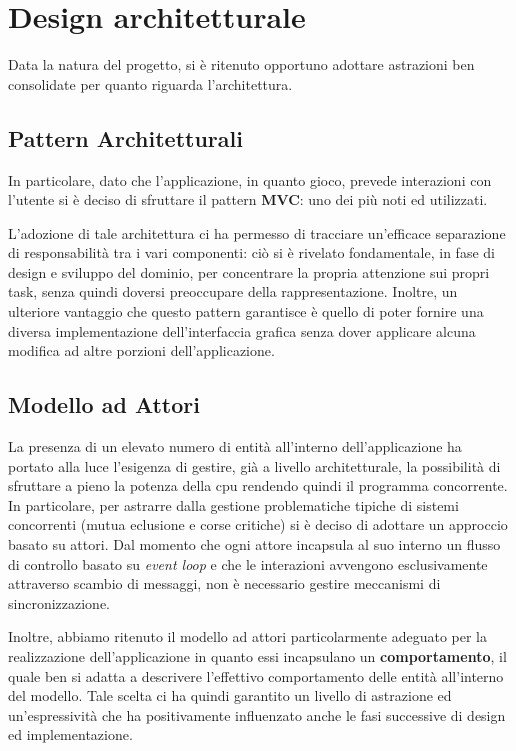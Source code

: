 \section{Design architetturale}\label{sec:architectural-design}
Data la natura del progetto, si è ritenuto opportuno adottare astrazioni ben consolidate per quanto riguarda
l'architettura.

\subsection{Pattern Architetturali}
In particolare, dato che l'applicazione, in quanto gioco, prevede interazioni con l'utente si è deciso
di sfruttare il pattern \textbf{MVC}: uno dei più noti ed utilizzati.

L'adozione di tale architettura ci ha permesso di tracciare un'efficace separazione di responsabilità
tra i vari componenti:
ciò si è rivelato fondamentale, in fase di design e sviluppo del dominio, per concentrare la propria attenzione
sui propri task, senza quindi doversi preoccupare della rappresentazione.
Inoltre, un ulteriore vantaggio che questo pattern garantisce è quello di poter fornire una diversa
implementazione dell'interfaccia grafica senza dover applicare alcuna modifica ad altre porzioni dell'applicazione.

\subsection{Modello ad Attori}
La presenza di un elevato numero di entità all'interno dell'applicazione ha portato alla luce l'esigenza di gestire,
già a livello architetturale, la possibilità di sfruttare a pieno la potenza della cpu rendendo quindi il programma
concorrente. In particolare, per astrarre dalla gestione problematiche tipiche di sistemi concorrenti
(mutua eclusione e corse critiche) si è deciso di adottare un approccio basato su attori. Dal momento che ogni attore
incapsula al suo interno un flusso di controllo basato su \textit{event loop} e che le interazioni avvengono
esclusivamente attraverso scambio di messaggi, non è necessario gestire meccanismi di sincronizzazione.

Inoltre, abbiamo ritenuto il modello ad attori particolarmente adeguato per la realizzazione dell'applicazione
in quanto essi incapsulano un \textbf{comportamento}, il quale ben si adatta a descrivere l'effettivo comportamento
delle entità all'interno del modello. Tale scelta ci ha quindi garantito un livello di astrazione ed un'espressività
che ha positivamente influenzato anche le fasi successive di design ed implementazione.


